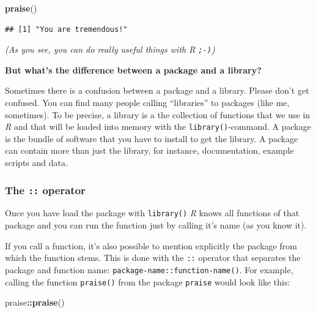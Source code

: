 \documentclass[
]{scrartcl}
\newenvironment{Shaded}{\begin{snugshade}}{\end{snugshade}}
\newcommand{\FunctionTok}[1]{\textcolor[rgb]{0.13,0.29,0.53}{\textbf{#1}}}
\newcommand{\NormalTok}[1]{#1}
\newcommand{\SpecialCharTok}[1]{\textcolor[rgb]{0.81,0.36,0.00}{\textbf{#1}}}
\begin{document}
\begin{Shaded}
\begin{Highlighting}[]
\FunctionTok{praise}\NormalTok{()}
\end{Highlighting}
\end{Shaded}

\begin{verbatim}
## [1] "You are tremendous!"
\end{verbatim}

\emph{(As you see, you can do really useful things with \emph{R} \texttt{;-)})}

\textbf{But what's the difference between a package and a library?}

Sometimes there is a confusion between a package and a library. Please don't get confused. You can find many people calling ``libraries'' to packages (like me, sometimes). To be precise, a library is a the collection of functions that we use in \emph{R} and that will be loaded into memory with the \texttt{library()}-command. A package is the bundle of software that you have to install to get the library. A package can contain more than just the library, for instance, documentation, example scripts and data.

\hypertarget{the-operator}{%
\subsubsection*{\texorpdfstring{The \texttt{::} operator}{The :: operator}}\label{the-operator}}

Once you have load the package with \texttt{library()} \emph{R} knows all functions of that package and you can run the function just by calling it's name (as you know it).

If you call a function, it's also possible to mention explicitly the package from which the function stems. This is done with the \texttt{::} operator that separates the package and function name: \texttt{package-name::function-name()}. For example, calling the function \texttt{praise()} from the package \texttt{praise} would look like this:

\begin{Shaded}
\begin{Highlighting}[]
\NormalTok{praise}\SpecialCharTok{::}\FunctionTok{praise}\NormalTok{()}
\end{Highlighting}
\end{Shaded}
\end{document}

